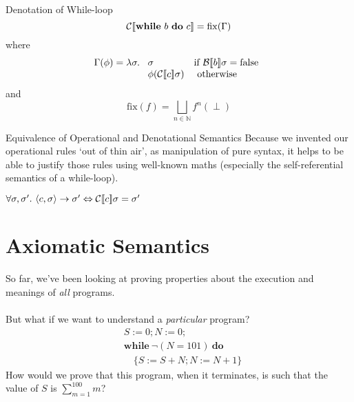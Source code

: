 \begin{frame}{Denotation of While-loop}
    \[\mathcal{C} [\![ \mathbf{while}\ b\ \mathbf{do}\ c ]\!] = \mathrm{fix}(\Gamma) \]
    where
    \[\Gamma(\phi) = \lambda \sigma.\ \begin{array}[t]{ll}
            \sigma & \text{if } \denB{b}\sigma = \mathrm{false} \\
            \phi(\denC{c}\sigma) & \textrm{ otherwise }
    \end{array}\]
    and
    \[\mathrm{fix}(f) = \bigsqcup_{n \in \mathbb{N}}{f^n(\perp)}\]
\end{frame}

\begin{frame}{Equivalence of Operational and Denotational Semantics}
    Because we invented our operational rules `out of thin air', as
    manipulation of pure syntax, it helps to be able to justify those
    rules using well-known maths (especially the self-referential semantics of
    a while-loop).
    \begin{theorem}
        $\forall \sigma, \sigma'.\ \langle c, \sigma \rangle \rightarrow \sigma' \Leftrightarrow \mathcal{C} [\![ c ]\!]{\sigma} = \sigma'$
    \end{theorem}
\end{frame}

\section{Axiomatic Semantics}

\begin{frame}
    So far, we've been looking at proving properties about the execution and
    meanings of \emph{all} programs.\\~\\
    \pause
    But what if we want to understand a \emph{particular} program?
    \pause
    \[\begin{aligned}
            &S := 0; N := 0; \\
            &\mathbf{while}\ \neg (N = 101)\ \mathbf{do}\\
            &\quad\{ S := S + N; N := N + 1 \}
        \end{aligned}\]
        \pause
    How would we prove that this program, when it terminates, is such that
    the value of $S$ is $\sum_{m=1}^{100} m$?
\end{frame}

